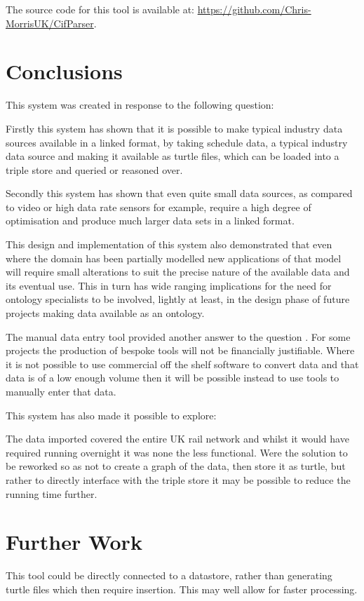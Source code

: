 The source code for this tool is available at: \url{https://github.com/Chris-MorrisUK/CifParser}.

\section{Conclusions}

This system was created in response to the following question: \textit{\QuestionOtherData}

Firstly this system has shown that it is possible to make typical industry data sources available in a linked format, by taking schedule data, a typical industry data source and making it available as turtle files, which can be loaded into a triple store and queried or reasoned over. 

Secondly this system has shown that even quite small data sources, as compared to video or high data rate sensors for example, require a high degree of optimisation and produce much larger data sets in a linked format. 

This design and implementation of this system also demonstrated that even where the domain has been partially modelled new applications of that model will require small alterations to suit the precise nature of the available data and its eventual use. This in turn has wide ranging implications for the need for ontology specialists to be involved, lightly at least, in the design phase of future projects making data available as an ontology.

The manual data entry tool provided another answer to the question \say{\QuestionOtherData}. For some projects the production of bespoke tools will not be financially justifiable. Where it is not possible to use commercial off the shelf software to convert data and that data is of a low enough volume then it will be possible instead to use tools to manually enter that data.

This system has also made it possible to explore: \textit{\QuestionCanOntologyScale}

The data imported covered the entire UK rail network and whilst it would have required running overnight it was none the less functional. Were the solution to be reworked so as not to create a graph of the data, then store it as turtle, but rather to directly interface with the triple store it may be possible to reduce the running time further.

\section{Further Work}
This tool could be directly connected to a datastore, rather than generating turtle files which then require insertion. This may well allow for faster processing.